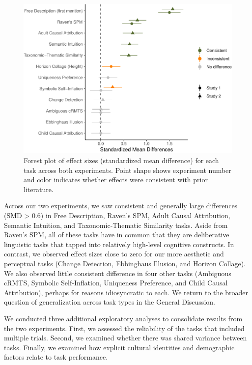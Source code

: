 \documentclass[
  man,floatsintext]{apa6}
\begin{document}
\begin{figure}
\centering
\includegraphics{CCRR_manuscript_files/figure-latex/es-plot-1.pdf}
\caption{\label{fig:es-plot}Forest plot of effect sizes (standardized mean difference) for each task across both experiments. Point shape shows experiment number and color indicates whether effects were consistent with prior literature.}
\end{figure}

Across our two experiments, we saw consistent and generally large differences (SMD \textgreater{} 0.6) in Free Description, Raven's SPM, Adult Causal Attribution, Semantic Intuition, and Taxonomic-Thematic Similarity tasks. Aside from Raven's SPM, all of these tasks have in common that they are deliberative linguistic tasks that tapped into relatively high-level cognitive constructs. In contrast, we observed effect sizes close to zero for our more aesthetic and perceptual tasks (Change Detection, Ebbinghaus Illusion, and Horizon Collage). We also observed little consistent difference in four other tasks (Ambiguous cRMTS, Symbolic Self-Inflation, Uniqueness Preference, and Child Causal Attribution), perhaps for reasons idiosyncratic to each. We return to the broader question of generalization across task types in the General Discussion.

We conducted three additional exploratory analyses to consolidate results from the two experiments. First, we assessed the reliability of the tasks that included multiple trials. Second, we examined whether there was shared variance between tasks. Finally, we examined how explicit cultural identities and demographic factors relate to task performance.
\end{document}
